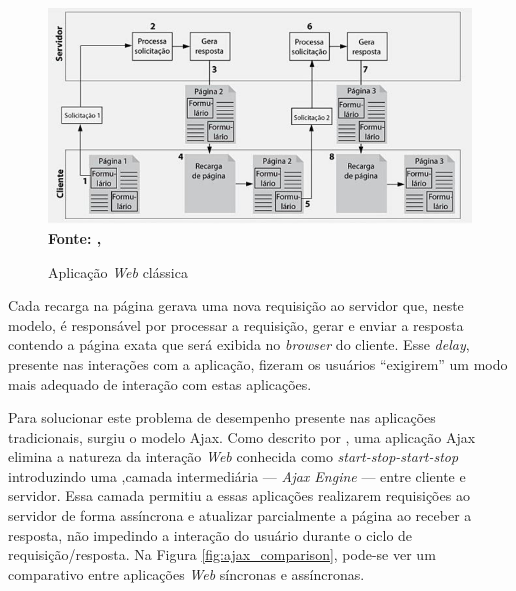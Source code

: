 \begin{figure}[!ht]
	\centering	
	\caption[\hspace{0.1cm}Aplicação \textit{Web} clássica.]{Aplicação \textit{Web} clássica}
	  \vspace{-0.4cm}
	\includegraphics[width=.8\textwidth]{figuras/arquitetura_web_tradicional.png}
	 \vspace{-0.3cm}
	\\\textbf{\footnotesize Fonte: \citeauthor{deitelAjax}, \citeyear{deitelAjax}}
	\label{fig:arquitetura_web_tradicional}
\end{figure}

Cada recarga na página gerava uma nova requisição ao servidor que, neste modelo, é responsável por processar a requisição, gerar e enviar a resposta 
contendo a página exata que será exibida no \textit{browser} do cliente. Esse \textit{delay}, presente nas interações com a aplicação, 
fizeram os usuários ``exigirem'' um modo mais adequado de interação com estas aplicações. 

Para solucionar este problema de desempenho presente nas aplicações tradicionais, surgiu o modelo Ajax. Como descrito por 
, uma 
aplicação Ajax elimina a natureza da interação \textit{Web} conhecida como \textit{start-stop-start-stop} introduzindo uma ,camada intermediária 
— \textit{Ajax Engine} — entre cliente e servidor. Essa camada permitiu a essas aplicações realizarem requisições ao servidor de forma assíncrona 
e atualizar parcialmente a página ao receber a resposta, não impedindo a interação do usuário durante o ciclo de requisição/resposta. Na 
Figura \ref{fig:ajax_comparison}, pode-se ver um comparativo entre aplicações \textit{Web} síncronas e assíncronas.

